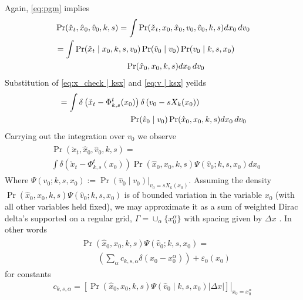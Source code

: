 \documentclass[conference]{IEEEtran}
\begin{document}
Again, \eqref{eq:pgm} implies
\begin{align}
	&\Pr( \check{x}_t , \hat{x}_0, \hat{v}_0, k,s) = \int \Pr( \check{x}_t , x_0, \hat{x}_0, v_0, \hat{v}_0, k,s) dx_0 \, dv_0 \\
		&=  \int \Pr( \check{x}_t \mid  x_0, k,s, v_0) \Pr( \hat{v}_0 \mid v_0) \Pr( v_0 \mid k,s,x_0) \\
		& \hspace{20ex} \Pr(\hat{x}_0, x_0, k, s) dx_0 \, dv_0 \\
\end{align}
Substitution of \eqref{eq:x_check | ksx} and \eqref{eq:v | ksx} yeilds
\begin{align}
		&= \int \delta\left( \check{x}_t - \Phi_{k,s}^{t}( x_0) \right) \delta\left( v_0 - s X_k (x_0) \right) \\
		&\hspace{20ex}\Pr( \hat{v}_0 \mid v_0) \Pr(\hat{x}_0, x_0,k, s) dx_0\, dv_0
\end{align}
Carrying out the integration over $v_0$ we observe
\begin{align}
\begin{split}
	&\Pr( \check{x}_t , \hat{x}_0, \hat{v}_0, k,s) = \\
	&\int \delta\left( \check{x}_t - \Phi_{k,s}^{t}( x_0) \right) \Pr(\hat{x}_0, x_0, k, s) \Psi(\hat{v}_0 ;k,s,x_0) dx_0
\end{split}
\label{eq:push forward}
\end{align}
 Where $\Psi( v_0 ;k,s,x_0) := \left. \Pr( \hat{v}_0 \mid v_0) \right|_{v_0 = s X_k(x_0)}$.
 Assuming the density $\Pr(\hat{x}_0, x_0, k, s) \Psi( \hat{v}_0 ; k, s, x_0)$ is of bounded variation in the variable $x_0$ (with all other variables held fixed),
 we may approximate it as a sum of weighted Dirac delta's supported on a regular grid, $\Gamma = \cup_{\alpha} \{ x_0^\alpha\}$ with spacing given by $\Delta x$ \cite{Rudin1991}.
In other words
\begin{align}
	\begin{split}
		&\Pr(\hat{x}_0, x_0, k, s) \Psi( \hat{v}_0 ; k, s, x_0 ) = \\
		&\qquad \left( \sum_{\alpha} c_{k,s,\alpha} \delta( x_0 - x_0^\alpha ) \right) + \varepsilon_0(x_0)
	\end{split}
	\label{eq:approximation 1}
\end{align}
for constants
\begin{align}
	c_{k,s,\alpha} =  \left. \left[ \Pr(\hat{x}_0, x_0, k, s) \Psi( \hat{v}_0 \mid k,s,x_0 )  | \Delta x | \right] \right|_{x_0 = x_0^\alpha} \label{eq:constants}
\end{align}
\end{document}
